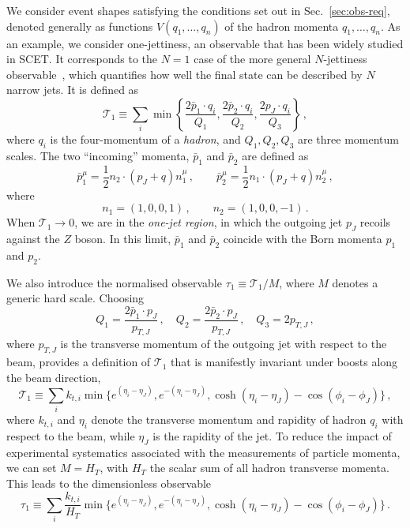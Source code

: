 We consider event shapes satisfying the conditions set out in
Sec.~\ref{sec:obs-req}, denoted generally as functions $V(q_1,\dots,q_n)$ of the
hadron momenta $q_1,\dots,q_n$.
As an example, we consider
one-jettiness, an observable that has been widely studied in SCET.  It corresponds to the 
$N=1$ case of the more general $N$-jettiness observable~\cite{Stewart:2010tn}, 
which quantifies how well the final state can be described by $N$ narrow jets. It is
defined as
\begin{equation}
 \label{eq:T1}
 \mathcal{T}_1\equiv \sum_{i} \min\left\{\frac{2 \bar{p}_1\cdot q_i}{Q_1}, \frac{2 \bar{p}_2\cdot q_i}{Q_2}, \frac{2 p_J \cdot q_i}{Q_3}\right\}\,,
\end{equation}
where $q_i$ is the four-momentum of a \emph{hadron}, and
$Q_1, Q_2, Q_3$ are three momentum scales. The two ``incoming'' momenta, 
$\bar p_1$ and $\bar p_2$ are defined as 
\begin{equation}
	\bar{p}_1^\mu=\frac{1}{2}n_2\cdot (p_J+q)n_1^{\mu}\,,\quad\quad
	\bar{p}_2^\mu=\frac{1}{2}n_1\cdot (p_J+q)n_2^{\mu}\,,
\end{equation}
where
\begin{equation}
  \label{eq:ni-incoming}
  n_1 = (1,0,0,1)\,,\qquad n_2 = (1,0,0,-1)\,.
\end{equation}
When $\mathcal{T}_1\to 0$, we are in the \emph{one-jet region}, in which
the outgoing jet $p_J$ recoils against the $Z$ boson. In this limit,
$\bar p_1$ and $\bar p_2$ coincide with the Born momenta $p_1$ and
$p_2$.

We also introduce the normalised observable
$\tau_1\equiv \mathcal{T}_1/M$, where $M$ denotes a generic hard scale. 
Choosing
\begin{equation}
  \label{eq:Qi-inv}
  Q_1 = \frac{2 \bar{p}_1\cdot p_J}{p_{T,J}}\,,  \quad Q_2 = \frac{2 \bar{p}_2\cdot p_J}{p_{T,J}}\,,
  \quad Q_3 = 2 p_{T,J}\,,
\end{equation}
where $p_{T,J}$ is the transverse momentum of the outgoing jet with
respect to the beam, provides a definition of $\mathcal{T}_1$ that is
manifestly invariant under boosts along the beam direction,
\begin{equation}
	\label{eq:T1-binv}
	\mathcal{T}_1\equiv  \sum_{i} k_{t,i}\min\{e^{(\eta_i-\eta_J)}, e^{-(\eta_i-\eta_J)}, \cosh(\eta_{i}-\eta_J)-\cos(\phi_{i}-\phi_J)\}\,,
\end{equation}
where $k_{t,i}$ and $\eta_i$ denote the transverse momentum and rapidity
of hadron $q_i$ with respect to the beam, while $\eta_J$ is the rapidity of the jet. 
To reduce the impact of experimental systematics associated with the measurements of particle momenta, 
we can set $M=H_T$, with $H_T$ the scalar sum of all hadron transverse
momenta. This leads to the dimensionless observable
\begin{equation}
	\label{eq:tau1-binv}
	\tau_1\equiv  \sum_{i} \frac{k_{t,i}}{H_T}\min\{e^{(\eta_i-\eta_J)}, e^{-(\eta_i-\eta_J)}, \cosh(\eta_{i}-\eta_J)-\cos(\phi_{i}-\phi_J)\}\,.
\end{equation}


